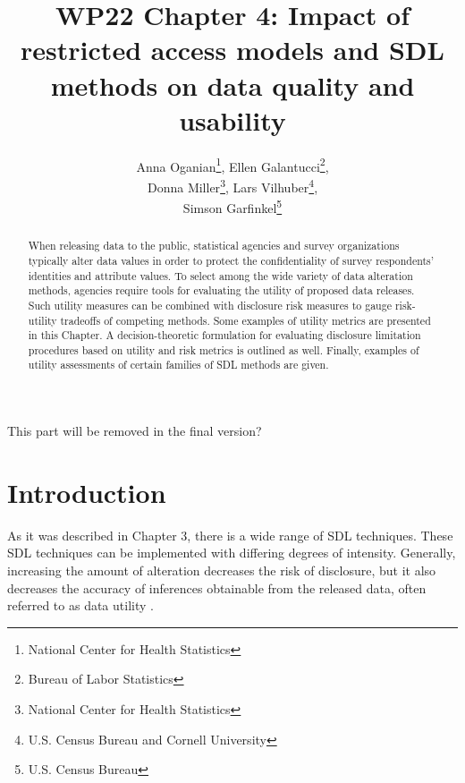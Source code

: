 \documentclass[12pt]{article}
\begin{document}
\title{WP22 Chapter 4: Impact of restricted access models and SDL methods on data quality and usability}

\author{%
Anna Oganian\thanks{National Center for Health Statistics}, 
Ellen Galantucci\thanks{Bureau of Labor Statistics}, \\
Donna Miller\thanks{National Center for Health Statistics}, 
Lars Vilhuber\thanks{U.S. Census Bureau and Cornell University}, \\
Simson Garfinkel\thanks{U.S. Census Bureau}
}

\maketitle
\newpage 
\begin{center}
    This part will be removed in the final version?
\end{center}
\tableofcontents

\newpage 

\begin{abstract}
When releasing data to the public, statistical agencies and survey
organizations typically alter data values in order to protect the
confidentiality of survey respondents' identities and attribute
values.  To select among the wide variety of data alteration
methods, agencies require tools for evaluating the utility of
proposed data releases.  Such utility measures can be combined
with disclosure risk measures to gauge risk-utility tradeoffs of
competing methods.  Some examples of utility metrics are presented in this Chapter.
A  decision-theoretic formulation for evaluating
disclosure limitation procedures based on utility and risk metrics is outlined
as well. Finally, examples of utility assessments of certain families of SDL methods are given. 


\end{abstract}

\section{Introduction}\label{sec.intro}

As it was described in Chapter 3, there is a wide range of \gls{SDL} techniques.
These \gls{SDL} techniques can be implemented with differing degrees of
intensity.  Generally, increasing the amount of alteration
decreases the risk of disclosure, but it also decreases the
accuracy of inferences obtainable from the released data, often
referred to as data utility \citep{Hund10}.
\end{document}
